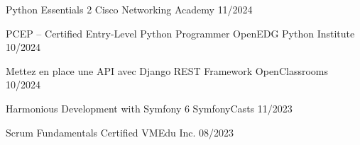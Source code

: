 



\begin{cvhonors}

  \cvhonor
    {Python Essentials 2} %
    {Cisco Networking Academy} %
    {} %
    {11/2024} %

  \cvhonor
    {PCEP – Certified Entry-Level
Python Programmer} %
    {OpenEDG Python Institute} %
    {} %
    {10/2024} %

  \cvhonor
    {Mettez en place une API avec Django REST Framework} %
    {OpenClassrooms} %
    {} %
    {10/2024} %

  \cvhonor
    {Harmonious Development with Symfony 6} %
    {SymfonyCasts} %
    {} %
    {11/2023} %

  \cvhonor
    {Scrum Fundamentals Certified} %
    {VMEdu Inc.} %
    {} %
    {08/2023} %

\end{cvhonors}

